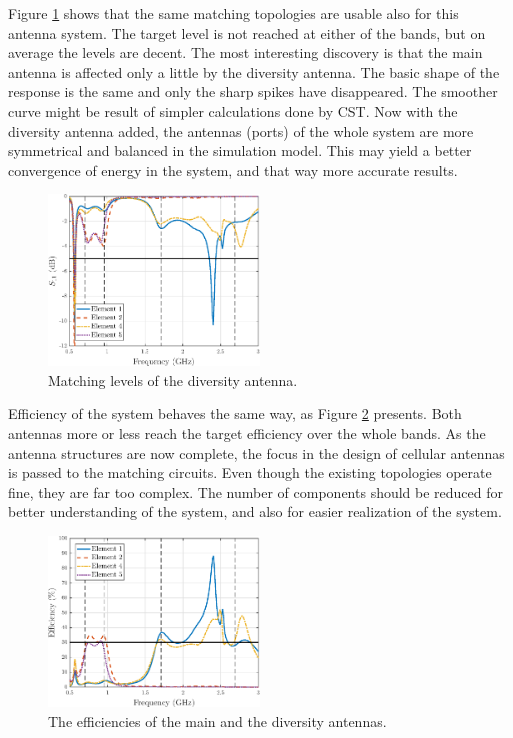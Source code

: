 Figure \ref{fig:div_match_orig} shows that the same matching topologies are usable also for this antenna system. The target level is not reached at either of the bands, but on average the levels are decent. The most interesting discovery is that the main antenna is affected only a little by the diversity antenna. The basic shape of the response is the same and only the sharp spikes have disappeared. The smoother curve might be result of simpler calculations done by CST. Now with the diversity antenna added, the antennas (ports) of the whole system are more symmetrical and balanced in the simulation model. This may yield a better convergence of energy in the system, and that way more accurate results. 
\begin{figure}[H]
    \vspace{-10pt}
    \centering
    \includegraphics[width=0.5\textwidth]{img/diversity_match_orig.eps}
    \caption{Matching levels of the diversity antenna.}
    \label{fig:div_match_orig}
\end{figure}

Efficiency of the system behaves the same way, as Figure \ref{fig:div_eff_orig} presents. Both antennas more or less reach the target efficiency over the whole bands. As the antenna structures are now complete, the focus in the design of cellular antennas is passed to the matching circuits. Even though the existing topologies operate fine, they are far too complex. The number of components should be reduced for better understanding of the system, and also for easier realization of the system.
\begin{figure}[H]
    \centering
    \includegraphics[width=0.5\textwidth]{img/diversity_eff_ideal_orig.eps}
    \caption{The efficiencies of the main and the diversity antennas.}
    \label{fig:div_eff_orig}
\end{figure}

